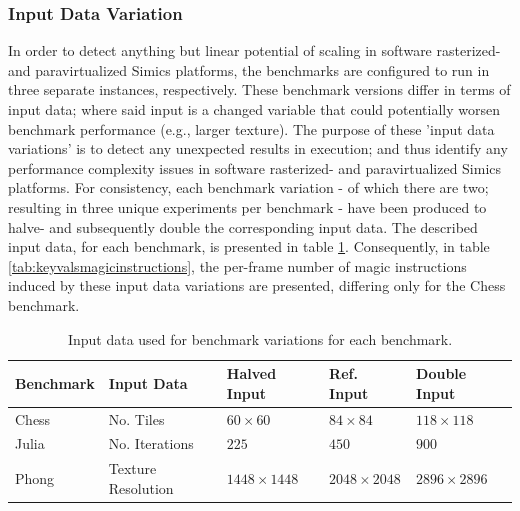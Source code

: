 \subsubsection{Input Data Variation}
\label{sec:experimentalmethodology_inputdatavariation}
In order to detect anything but linear potential of scaling in software rasterized- and paravirtualized Simics platforms, the benchmarks are configured to run in three separate instances, respectively.
These benchmark versions differ in terms of input data; where said input is a changed variable that could potentially worsen benchmark performance (e.g., larger texture).
The purpose of these 'input data variations' is to detect any unexpected results in execution; and thus identify any performance complexity issues in software rasterized- and paravirtualized Simics platforms.
For consistency, each benchmark variation - of which there are two; resulting in three unique experiments per benchmark - have been produced to halve- and subsequently double the corresponding input data.
The described input data, for each benchmark, is presented in table \ref{tab:keyvals}.
Consequently, in table \ref{tab:keyvalsmagicinstructions}, the per-frame number of magic instructions induced by these input data variations are presented, differing only for the Chess benchmark.

\begin{table}
  \centering
  \begin{tabular}{lllll}
    Benchmark & Input Data & Halved Input & Ref. Input & Double Input \\ \hline
    Chess & No. Tiles & $60\times60$ & $84\times84$ & $118\times118$ \\
    Julia & No. Iterations & $225$ & $450$ & $900$ \\
    Phong & Texture Resolution & $1448\times1448$ & $2048\times2048$ & $2896\times2896$ \\
  \end{tabular}
  \caption[Input data variations]{Input data used for benchmark variations for each benchmark.}
  \label{tab:keyvals}
\end{table}

